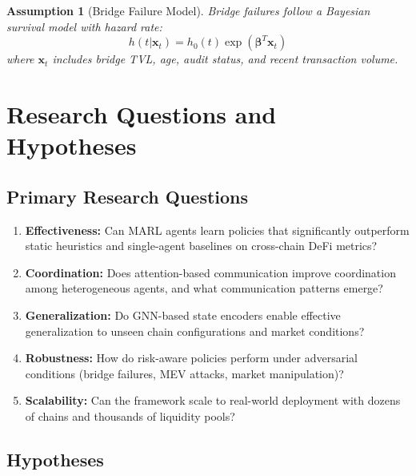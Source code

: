 \documentclass[11pt,a4paper]{article}
\newtheorem{assumption}[theorem]{Assumption}
\begin{document}
\begin{assumption}[Bridge Failure Model]
Bridge failures follow a Bayesian survival model with hazard rate:
\begin{equation}
h(t | \mathbf{x}_t) = h_0(t) \exp\left( \boldsymbol{\beta}^T \mathbf{x}_t \right)
\end{equation}
where $\mathbf{x}_t$ includes bridge TVL, age, audit status, and recent transaction volume.
\end{assumption}

\section{Research Questions and Hypotheses}\label{sec:rqs}

\subsection{Primary Research Questions}

\begin{enumerate}[label=\textbf{RQ\arabic*:}, leftmargin=3em]
    \item \textbf{Effectiveness:} Can MARL agents learn policies that significantly outperform static heuristics and single-agent baselines on cross-chain DeFi metrics?
    
    \item \textbf{Coordination:} Does attention-based communication improve coordination among heterogeneous agents, and what communication patterns emerge?
    
    \item \textbf{Generalization:} Do GNN-based state encoders enable effective generalization to unseen chain configurations and market conditions?
    
    \item \textbf{Robustness:} How do risk-aware policies perform under adversarial conditions (bridge failures, MEV attacks, market manipulation)?
    
    \item \textbf{Scalability:} Can the framework scale to real-world deployment with dozens of chains and thousands of liquidity pools?
\end{enumerate}

\subsection{Hypotheses}
\end{document}
